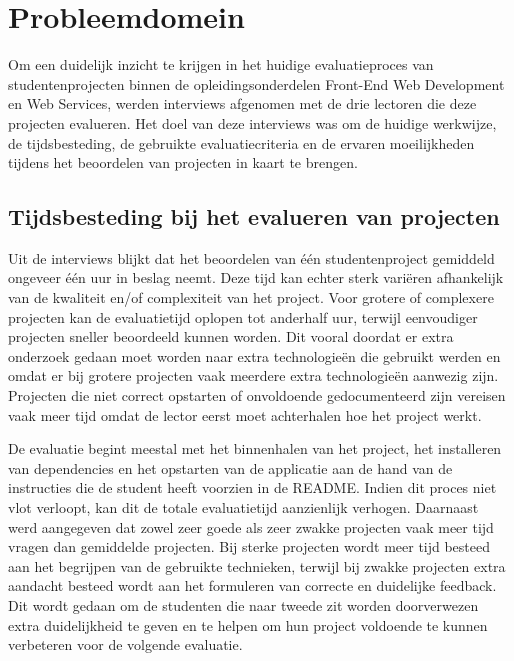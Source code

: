 \chapter{Probleemdomein}%
\label{ch:probleemdomein}

Om een duidelijk inzicht te krijgen in het huidige evaluatieproces van studentenprojecten binnen de opleidingsonderdelen Front-End Web Development en Web Services, werden interviews afgenomen met de drie lectoren die deze projecten evalueren. Het doel van deze interviews was om de huidige werkwijze, de tijdsbesteding, de gebruikte evaluatiecriteria en de ervaren moeilijkheden tijdens het beoordelen van projecten in kaart te brengen.

\section{Tijdsbesteding bij het evalueren van projecten}

Uit de interviews blijkt dat het beoordelen van één studentenproject gemiddeld ongeveer één uur in beslag neemt. Deze tijd kan echter sterk variëren afhankelijk van de kwaliteit en/of complexiteit van het project. Voor grotere of complexere projecten kan de evaluatietijd oplopen tot anderhalf uur, terwijl eenvoudiger projecten sneller beoordeeld kunnen worden. Dit vooral doordat er extra onderzoek gedaan moet worden naar extra technologieën die gebruikt werden en omdat er bij grotere projecten vaak meerdere extra technologieën aanwezig zijn. Projecten die niet correct opstarten of onvoldoende gedocumenteerd zijn vereisen vaak meer tijd omdat de lector eerst moet achterhalen hoe het project werkt.

\vspace{1em}

De evaluatie begint meestal met het binnenhalen van het project, het installeren van dependencies en het opstarten van de applicatie aan de hand van de instructies die de student heeft voorzien in de README. Indien dit proces niet vlot verloopt, kan dit de totale evaluatietijd aanzienlijk verhogen. Daarnaast werd aangegeven dat zowel zeer goede als zeer zwakke projecten vaak meer tijd vragen dan gemiddelde projecten. Bij sterke projecten wordt meer tijd besteed aan het begrijpen van de gebruikte technieken, terwijl bij zwakke projecten extra aandacht besteed wordt aan het formuleren van correcte en duidelijke feedback. Dit wordt gedaan om de studenten die naar tweede zit worden doorverwezen extra duidelijkheid te geven en te helpen om hun project voldoende te kunnen verbeteren voor de volgende evaluatie.

